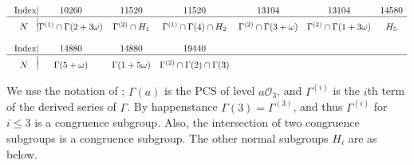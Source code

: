 \documentclass[11pt]{amsart}
\theoremstyle{definition}
\theoremstyle{remark}
\newcommand{\G}{{\Gamma}}
\begin{document}
\begin{table}[h]
\begin{center}
\begin{tiny}
\[\begin{array}{c@{|}cccccc}
\multicolumn{2}{c}{}\\\
\mbox{Index}
& 10260& 11520 & 11520& 13104& 13104& 14580\\
\hline
\vspace{-6.5pt} & & & & & & \\
N
&\Gamma^{(1)}\cap\Gamma(2+3\omega)&\Gamma^{(2)}\cap
H_1&\Gamma^{(1)}\cap\Gamma(4)\cap H_2&
\Gamma^{(2)}\cap\Gamma(3+\omega)&\Gamma^{(2)}\cap\Gamma(1+3\omega)&H_5\\
\multicolumn{2}{c}{}\\\
\mbox{Index} & 14880& 14880& 19440\\
\hline
\vspace{-6.5pt} & & & & & & \\
N
&\Gamma(5+\omega)&\Gamma(1+5\omega)&
\Gamma^{(2)}\cap\Gamma(2)\cap\Gamma(3)\\
\end{array}
\]
\end{tiny}
\end{center}
\end{table}


We use the notation of \cite{Alperin}; $\G(a)$ is the  
PCS of level $a\mathcal{O}_3$,
and $\G^{(i)}$ is the $i$th term of the derived series 
of $\G$. By happenstance $\Gamma(3)=\Gamma^{(3)}$, and thus 
$\G^{(i)}$ for $i\leq 3$ is a congruence subgroup.
Also, the intersection of two congruence subgroups is a 
congruence subgroup. The other normal subgroups $H_i$ are 
as below.
\end{document}

